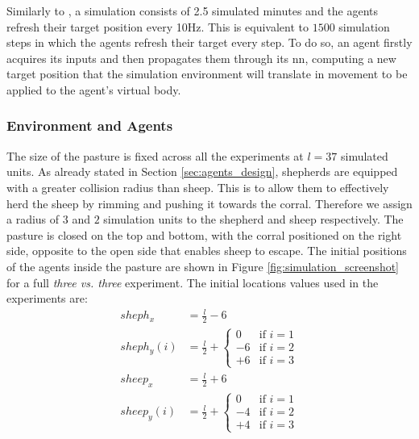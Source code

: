 \documentclass[conference]{IEEEtran}
\begin{document}
Similarly to \cite{potter2001heterogeneity}, a simulation consists of 2.5 simulated minutes and the agents refresh their target position every 10Hz.
This is equivalent to $1500$ simulation steps in which the agents refresh their target every step.
To do so, an agent firstly acquires its inputs and then propagates them through its \gls{nn}, computing a new target position that the simulation environment will translate in movement to be applied to the agent's virtual body.

\vspace{0.5em}
\subsubsection{Environment and Agents}
The size of the pasture is fixed across all the experiments at $l = 37$ simulated units.
As already stated in Section \ref{sec:agents_design}, shepherds are equipped with a greater collision radius than sheep.
This is to allow them to effectively herd the sheep by rimming and pushing it towards the corral.
Therefore we assign a radius of $3$ and $2$ simulation units to the shepherd and sheep respectively.
The pasture is closed on the top and bottom, with the corral positioned on the right side, opposite to the open side that enables sheep to escape.
The initial positions of the agents inside the pasture are shown in Figure \ref{fig:simulation_screenshot} for a full \textit{three vs. three} experiment.
The initial locations values used in the experiments are:
\begin{align}
sheph_x &= \frac{l}{2} - 6 \\
sheph_y(i) &= \frac{l}{2} + \begin{cases} 0 & \text{if } i=1 \\ -6 & \text{if } i=2 \\ +6 & \text{if } i=3 \end{cases} \\
sheep_x &= \frac{l}{2} + 6 \\
sheep_y(i) &= \frac{l}{2} + \begin{cases} 0 & \text{if } i=1 \\ -4 & \text{if } i=2 \\ +4 & \text{if } i=3 \end{cases}
\end{align}
\end{document}
